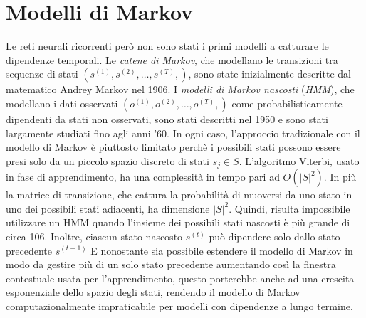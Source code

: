 \section{Modelli di Markov} %
Le reti neurali ricorrenti per\`o non sono stati i primi modelli a catturare le dipendenze temporali.
Le \emph{catene di Markov}, che modellano le transizioni tra sequenze di stati $(s^{(1)}, s^{(2)}, \dots, s^{(T)},)$, sono state inizialmente descritte dal matematico Andrey Markov nel 1906.
I \emph{modelli di Markov nascosti} (\emph{HMM}), che modellano i dati osservati $(o^{(1)}, o^{(2)}, \dots, o^{(T)},)$ come probabilisticamente dipendenti da stati non osservati, sono stati descritti nel 1950 e sono stati largamente studiati fino agli anni '60.
In ogni caso, l'approccio tradizionale con il modello di Markov \`e piuttosto limitato perch\`e i possibili stati possono essere presi solo da un piccolo spazio discreto di stati $ s_j \in S$.
L'algoritmo Viterbi, usato in fase di apprendimento, ha una complessit\`a in tempo pari ad $O(|S|^2)$.
In pi\`u la matrice di transizione, che cattura la probabilit\`a di muoversi da uno stato in uno dei possibili stati adiacenti, ha dimensione $|S|^2$.
Quindi, risulta impossibile utilizzare un HMM quando l'insieme dei possibili stati nascosti \`e pi\`u grande di circa 106.
Inoltre, ciascun stato nascosto $s^{(t)}$ pu\`o dipendere solo dallo stato precedente $s^{(t+1)}$
E nonostante sia possibile estendere il modello di Markov in modo da gestire pi\`u di un solo stato precedente aumentando cos\`i la finestra contestuale usata per l'apprendimento, questo porterebbe anche ad una crescita esponenziale dello spazio degli stati, rendendo il modello di Markov computazionalmente impraticabile per modelli con dipendenze a lungo termine.


